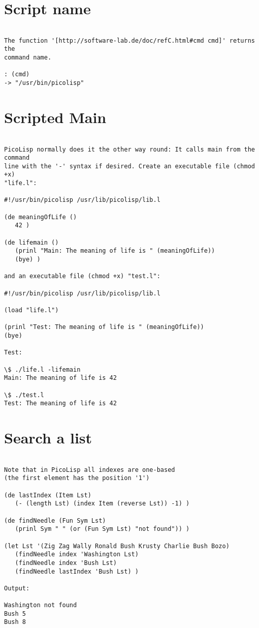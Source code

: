 \section*{Script name}

\begin{verbatim}

The function '[http://software-lab.de/doc/refC.html#cmd cmd]' returns the
command name.

: (cmd)
-> "/usr/bin/picolisp"

\end{verbatim}

\section*{Scripted Main}

\begin{verbatim}

PicoLisp normally does it the other way round: It calls main from the command
line with the '-' syntax if desired. Create an executable file (chmod +x)
"life.l":

#!/usr/bin/picolisp /usr/lib/picolisp/lib.l

(de meaningOfLife ()
   42 )

(de lifemain ()
   (prinl "Main: The meaning of life is " (meaningOfLife))
   (bye) )

and an executable file (chmod +x) "test.l":

#!/usr/bin/picolisp /usr/lib/picolisp/lib.l

(load "life.l")

(prinl "Test: The meaning of life is " (meaningOfLife))
(bye)

Test:

\$ ./life.l -lifemain
Main: The meaning of life is 42

\$ ./test.l
Test: The meaning of life is 42

\end{verbatim}

\section*{Search a list}

\begin{verbatim}

Note that in PicoLisp all indexes are one-based
(the first element has the position '1')

(de lastIndex (Item Lst)
   (- (length Lst) (index Item (reverse Lst)) -1) )

(de findNeedle (Fun Sym Lst)
   (prinl Sym " " (or (Fun Sym Lst) "not found")) )

(let Lst '(Zig Zag Wally Ronald Bush Krusty Charlie Bush Bozo)
   (findNeedle index 'Washington Lst)
   (findNeedle index 'Bush Lst)
   (findNeedle lastIndex 'Bush Lst) )

Output:

Washington not found
Bush 5
Bush 8

\end{verbatim}

